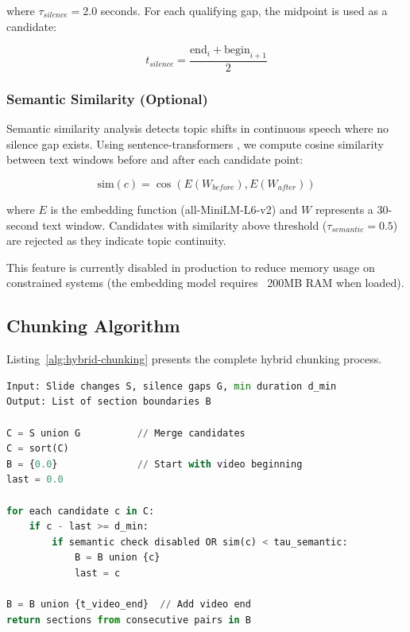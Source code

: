 where $\tau_{silence} = 2.0$ seconds. For each qualifying gap, the midpoint is used as a candidate:

\begin{equation}
    t_{silence} = \frac{\text{end}_i + \text{begin}_{i+1}}{2}
\end{equation}

\subsubsection{Semantic Similarity (Optional)}

Semantic similarity analysis detects topic shifts in continuous speech where no silence gap exists. Using sentence-transformers \cite{reimers2019sentence}, we compute cosine similarity between text windows before and after each candidate point:

\begin{equation}
    \text{sim}(c) = \cos(E(W_{before}), E(W_{after}))
\end{equation}

where $E$ is the embedding function (all-MiniLM-L6-v2) and $W$ represents a 30-second text window. Candidates with similarity above threshold ($\tau_{semantic} = 0.5$) are rejected as they indicate topic continuity.

This feature is currently disabled in production to reduce memory usage on constrained systems (the embedding model requires ~200MB RAM when loaded).

\subsection{Chunking Algorithm}

Listing~\ref{alg:hybrid-chunking} presents the complete hybrid chunking process.

\begin{lstlisting}[language=Python, caption={Hybrid Video Chunking}, label={alg:hybrid-chunking}]
Input: Slide changes S, silence gaps G, min duration d_min
Output: List of section boundaries B

C = S union G          // Merge candidates
C = sort(C)
B = {0.0}              // Start with video beginning
last = 0.0

for each candidate c in C:
    if c - last >= d_min:
        if semantic check disabled OR sim(c) < tau_semantic:
            B = B union {c}
            last = c

B = B union {t_video_end}  // Add video end
return sections from consecutive pairs in B
\end{lstlisting}

